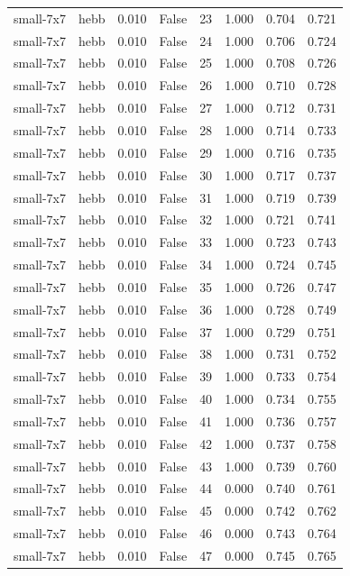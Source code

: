 \begin{tabular}{llrrrrrr}
small-7x7 & hebb & 0.010 & False & 23 & 1.000 & 0.704 & 0.721 \\
small-7x7 & hebb & 0.010 & False & 24 & 1.000 & 0.706 & 0.724 \\
small-7x7 & hebb & 0.010 & False & 25 & 1.000 & 0.708 & 0.726 \\
small-7x7 & hebb & 0.010 & False & 26 & 1.000 & 0.710 & 0.728 \\
small-7x7 & hebb & 0.010 & False & 27 & 1.000 & 0.712 & 0.731 \\
small-7x7 & hebb & 0.010 & False & 28 & 1.000 & 0.714 & 0.733 \\
small-7x7 & hebb & 0.010 & False & 29 & 1.000 & 0.716 & 0.735 \\
small-7x7 & hebb & 0.010 & False & 30 & 1.000 & 0.717 & 0.737 \\
small-7x7 & hebb & 0.010 & False & 31 & 1.000 & 0.719 & 0.739 \\
small-7x7 & hebb & 0.010 & False & 32 & 1.000 & 0.721 & 0.741 \\
small-7x7 & hebb & 0.010 & False & 33 & 1.000 & 0.723 & 0.743 \\
small-7x7 & hebb & 0.010 & False & 34 & 1.000 & 0.724 & 0.745 \\
small-7x7 & hebb & 0.010 & False & 35 & 1.000 & 0.726 & 0.747 \\
small-7x7 & hebb & 0.010 & False & 36 & 1.000 & 0.728 & 0.749 \\
small-7x7 & hebb & 0.010 & False & 37 & 1.000 & 0.729 & 0.751 \\
small-7x7 & hebb & 0.010 & False & 38 & 1.000 & 0.731 & 0.752 \\
small-7x7 & hebb & 0.010 & False & 39 & 1.000 & 0.733 & 0.754 \\
small-7x7 & hebb & 0.010 & False & 40 & 1.000 & 0.734 & 0.755 \\
small-7x7 & hebb & 0.010 & False & 41 & 1.000 & 0.736 & 0.757 \\
small-7x7 & hebb & 0.010 & False & 42 & 1.000 & 0.737 & 0.758 \\
small-7x7 & hebb & 0.010 & False & 43 & 1.000 & 0.739 & 0.760 \\
small-7x7 & hebb & 0.010 & False & 44 & 0.000 & 0.740 & 0.761 \\
small-7x7 & hebb & 0.010 & False & 45 & 0.000 & 0.742 & 0.762 \\
small-7x7 & hebb & 0.010 & False & 46 & 0.000 & 0.743 & 0.764 \\
small-7x7 & hebb & 0.010 & False & 47 & 0.000 & 0.745 & 0.765 \\

\end{tabular}
